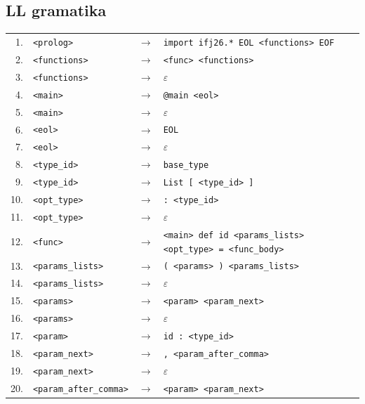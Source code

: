 \subsection{LL gramatika}
{\small
\begin{longtable}{rlcl}
1. & \texttt{<prolog>} & $\rightarrow$ & \texttt{import ifj26.* EOL <functions> EOF} \\
2. & \texttt{<functions>} & $\rightarrow$ & \texttt{<func> <functions>} \\
3. & \texttt{<functions>} & $\rightarrow$ & $\varepsilon$ \\
4. & \texttt{<main>} & $\rightarrow$ & \texttt{@main <eol>} \\
5. & \texttt{<main>} & $\rightarrow$ & $\varepsilon$ \\
6. & \texttt{<eol>} & $\rightarrow$ & \texttt{EOL} \\
7. & \texttt{<eol>} & $\rightarrow$ & $\varepsilon$ \\
8. & \texttt{<type\_id>} & $\rightarrow$ & \texttt{base\_type} \\
9. & \texttt{<type\_id>} & $\rightarrow$ & \texttt{List [ <type\_id> ]} \\
10. & \texttt{<opt\_type>} & $\rightarrow$ & \texttt{: <type\_id>} \\
11. & \texttt{<opt\_type>} & $\rightarrow$ & $\varepsilon$ \\
12. & \texttt{<func>} & $\rightarrow$ & \texttt{<main> def id <params\_lists> <opt\_type> = <func\_body>} \\
13. & \texttt{<params\_lists>} & $\rightarrow$ & \texttt{( <params> ) <params\_lists>} \\
14. & \texttt{<params\_lists>} & $\rightarrow$ & $\varepsilon$ \\
15. & \texttt{<params>} & $\rightarrow$ & \texttt{<param> <param\_next>} \\
16. & \texttt{<params>} & $\rightarrow$ & $\varepsilon$ \\
17. & \texttt{<param>} & $\rightarrow$ & \texttt{id : <type\_id>} \\
18. & \texttt{<param\_next>} & $\rightarrow$ & \texttt{, <param\_after\_comma>} \\
19. & \texttt{<param\_next>} & $\rightarrow$ & $\varepsilon$ \\
20. & \texttt{<param\_after\_comma>} & $\rightarrow$ & \texttt{<param> <param\_next>} \\

\end{longtable}}
